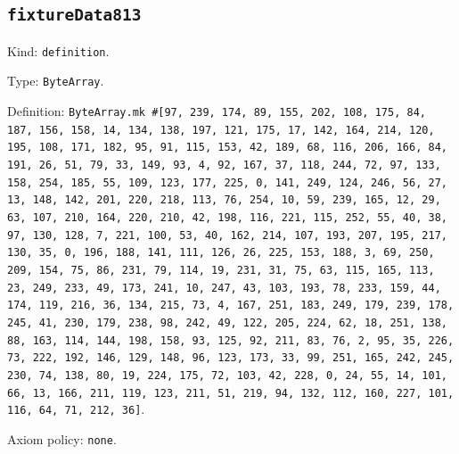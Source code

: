 \documentclass[11pt]{article}
\begin{document}
\subsection*{\texttt{fixtureData813}}
\noindent Kind: \texttt{definition}.\par
\noindent Type: \texttt{ByteArray}.\par
\noindent Definition: \texttt{ByteArray.mk \#[97, 239, 174, 89, 155, 202, 108, 175, 84, 187, 156, 158, 14, 134, 138, 197, 121, 175, 17, 142, 164, 214, 120, 195, 108, 171, 182, 95, 91, 115, 153, 42, 189, 68, 116, 206, 166, 84, 191, 26, 51, 79, 33, 149, 93, 4, 92, 167, 37, 118, 244, 72, 97, 133, 158, 254, 185, 55, 109, 123, 177, 225, 0, 141, 249, 124, 246, 56, 27, 13, 148, 142, 201, 220, 218, 113, 76, 254, 10, 59, 239, 165, 12, 29, 63, 107, 210, 164, 220, 210, 42, 198, 116, 221, 115, 252, 55, 40, 38, 97, 130, 128, 7, 221, 100, 53, 40, 162, 214, 107, 193, 207, 195, 217, 130, 35, 0, 196, 188, 141, 111, 126, 26, 225, 153, 188, 3, 69, 250, 209, 154, 75, 86, 231, 79, 114, 19, 231, 31, 75, 63, 115, 165, 113, 23, 249, 233, 49, 173, 241, 10, 247, 43, 103, 193, 78, 233, 159, 44, 174, 119, 216, 36, 134, 215, 73, 4, 167, 251, 183, 249, 179, 239, 178, 245, 41, 230, 179, 238, 98, 242, 49, 122, 205, 224, 62, 18, 251, 138, 88, 163, 114, 144, 198, 158, 93, 125, 92, 211, 83, 76, 2, 95, 35, 226, 73, 222, 192, 146, 129, 148, 96, 123, 173, 33, 99, 251, 165, 242, 245, 230, 74, 138, 80, 19, 224, 175, 72, 103, 42, 228, 0, 24, 55, 14, 101, 66, 13, 166, 211, 119, 123, 211, 51, 219, 94, 132, 112, 160, 227, 101, 116, 64, 71, 212, 36]}.\par
\noindent Axiom policy: \texttt{none}.\par
\end{document}
